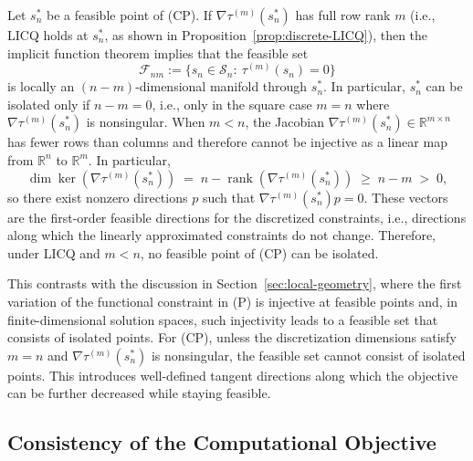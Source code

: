\documentclass[12pt,leqno]{amsart}
\begin{document}
Let $s_n^*$ be a feasible point of (CP). 
If $\nabla\tau^{(m)}(s_n^*)$ has full row rank $m$ (i.e., LICQ holds at $s_n^*$, as shown in Proposition~\ref{prop:discrete-LICQ}), then the implicit function theorem implies that the feasible set
\[
\mathcal{F}_{nm}:=\{s_n\in\mathcal{S}_{n}:\ \tau^{(m)}(s_n)=0\}
\]
is locally an $(n-m)$-dimensional manifold through $s_n^*$.
In particular, $s_n^*$ can be isolated only if $n-m=0$, i.e., only in the square case $m=n$ where $\nabla\tau^{(m)}(s_n^*)$ is nonsingular.
When $m<n$, the Jacobian $\nabla\tau^{(m)}(s_n^*)\in\mathbb{R}^{m\times n}$ has fewer rows than columns and therefore cannot be injective as a linear map from $\mathbb{R}^n$ to $\mathbb{R}^m$. 
In particular,
\[
\dim\ker(\nabla\tau^{(m)}(s_n^*)) \;=\; n-\operatorname{rank}(\nabla\tau^{(m)}(s_n^*)) \;\ge\; n-m \;>\; 0,
\]
so there exist nonzero directions $p$ such that $\nabla\tau^{(m)}(s_n^*)p=0$. 
These vectors are the first-order feasible directions for the discretized constraints, i.e., directions along which the linearly approximated constraints do not change.
Therefore, under LICQ and $m<n$, no feasible point of (CP) can be isolated.

This contrasts with the discussion in Section~\ref{sec:local-geometry}, where the first variation of the functional constraint in \textnormal{(P)} is injective at feasible points and, in finite-dimensional solution spaces, such injectivity leads to a feasible set that consists of isolated points.
For (CP), unless the discretization dimensions satisfy $m=n$ and $\nabla \tau^{(m)}(s_n^*)$ is nonsingular, the feasible set cannot consist of isolated points.
This introduces well-defined tangent directions along which the objective can be further decreased while staying feasible.

\subsection{Consistency of the Computational Objective}\label{subsec:comp_consistency}
\end{document}
